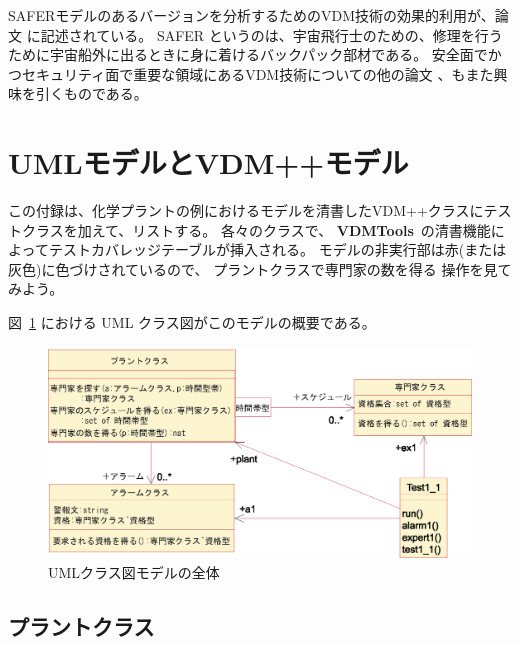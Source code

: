 \documentclass[\pformat,12pt,twoside]{jarticle}
\newcommand{\vdmtools}{\textbf{VDMTools}}
\begin{document}
SAFERモデルのあるバージョンを分析するためのVDM技術の効果的利用が、論文 \cite{Agerholm&97c,Agerholm&99}に記述されている。
SAFER というのは、宇宙飛行士のための、修理を行うために宇宙船外に出るときに身に着けるバックパック部材である。
安全面でかつセキュリティ面で重要な領域にあるVDM技術についての他の論文 \cite{Agerholm&98a,Larsen&96a}、もまた興味を引くものである。





\newpage
\appendix
\section{UMLモデルとVDM++モデル}


この付録は、化学プラントの例におけるモデルを清書したVDM++クラスにテストクラスを加えて、リストする。
各々のクラスで、 \vdmtools\ の清書機能によってテストカバレッジテーブルが挿入される。
モデルの非実行部は赤(または灰色)に色づけされているので、 プラントクラスで専門家の数を得る 操作を見てみよう。

 図~\ref{fig:fulldiagram} における UML クラス図がこのモデルの概要である。

\begin{figure}[htb]
\begin{center}
\includegraphics[width=5.967in]{fulldiagram}
\caption{UMLクラス図モデルの全体 \label{fig:fulldiagram}}
\end{center}
\end{figure}

\subsection{プラントクラス}
\end{document}
